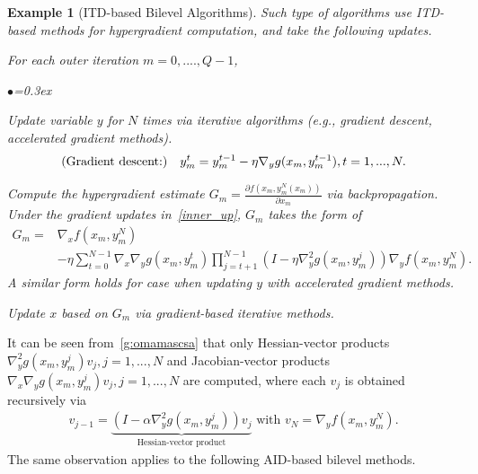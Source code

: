 \documentclass{osudissert96}
\newtheorem{example}{Example}
\begin{document}
\begin{example}[ITD-based Bilevel Algorithms]\label{exam:itd}\cite{maclaurin2015gradient,franceschi2017forward,ji2020bilevel,grazzi2020iteration} Such type of algorithms use ITD-based methods for hypergradient computation, and take the following updates.  

\vspace{0.2cm}
\noindent For each outer iteration $m=0,....,Q-1$,
\begin{list}{$\bullet$}{\topsep=0.3ex \leftmargin=0.09in  \itemsep =0.01in}
\item  Update variable $y$ for $N$ times via iterative algorithms (e.g., gradient descent, accelerated gradient methods).%
\begin{align}\label{inner_up}
(\text{\normalfont Gradient descent:}) \quad y_{m}^t =  y_m^{t-1} - \eta \nabla_y g(x_m, y_m^{t-1}), t=1,...,N.
\end{align}
\item Compute the hypergradient estimate $G_m=\frac{\partial f(x_m,y_m^N(x_m))}{\partial x_m}$ via backpropagation. Under the gradient updates in~\cref{inner_up}, $G_m$ takes the form of %
\begin{align}\label{g:omamascsa}
G_m =& \nabla_x f(x_m,y^N_m) \nonumber
\\&-\eta\sum_{t=0}^{N-1}\nabla_x\nabla_y g(x_m,y_m^t)\prod_{j=t+1}^{N-1}(I-\eta  \nabla^2_y g(x_m,y_m^{j}))\nabla_y f(x_m,y_m^N).
\end{align}
A similar form holds for case when updating $y$ with accelerated gradient methods. 
\item Update $x$ based on $G_m$ via gradient-based iterative methods.
\end{list}
\end{example}
It can be seen from~\cref{g:omamascsa}  that only Hessian-vector products $ \nabla^2_y g(x_m,y_m^{j})v_j, j=1,...,N$ and Jacobian-vector products $\nabla_x\nabla_y g(x_m,y_m^j)v_{j},j=1,...,N$ are computed, where each $v_j$ is  obtained recursively via   
\begin{align*}
v_{j-1} = \underbrace{(I-\alpha  \nabla^2_y g(x_m,y_m^{j}))v_j}_{\text{Hessian-vector product}} \text{ with } v_N = \nabla_y f(x_m,y_m^N).
\end{align*} 
The same observation applies to the following AID-based bilevel methods.
\end{document}
